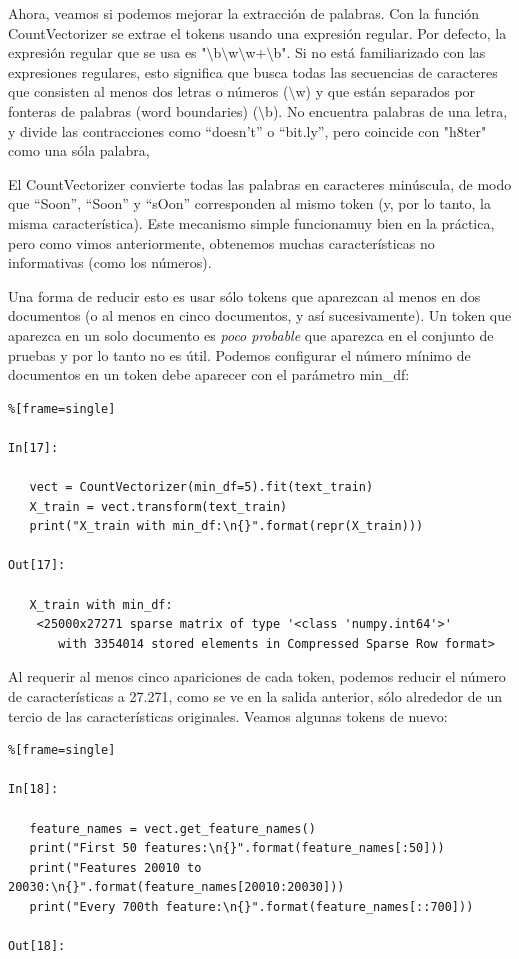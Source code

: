 Ahora, veamos si podemos mejorar la extracción de palabras.  Con la función  {\ttfamily CountVectorizer}
se extrae el tokens usando una expresión regular. Por defecto, la expresión regular que 
se usa es "{}$\setminus$b$\setminus$w$\setminus$w+$\setminus$b"{}.  
Si no está familiarizado con las expresiones regulares, esto significa que
busca todas las secuencias de caracteres que consisten  al menos dos letras o 
números ($\setminus$w) y que están separados por fonteras de palabras (word boundaries) ($\setminus$b). 
No encuentra palabras de una letra, y divide las contracciones como  “doesn’t{}”  o 
  “bit.ly{}”,  pero coincide  con "{}h8ter"{} como una sóla palabra,


 El {\ttfamily CountVectorizer} convierte todas las palabras en caracteres  minúscula, de modo que
“Soon”, “Soon” y “sOon” corresponden al mismo token (y, por lo tanto, la misma característica).
Este mecanismo simple funcionamuy bien en la práctica, pero como vimos anteriormente, obtenemos
muchas características no informativas (como los números). 

Una forma de reducir esto es  usar sólo tokens que aparezcan  al menos en dos documentos (o al menos en cinco documentos, y así sucesivamente). Un token que aparezca en un solo documento  es \emph{poco probable} que aparezca en el conjunto de pruebas y por lo tanto no es útil. Podemos configurar el número mínimo de documentos en un token debe aparecer con el parámetro {\ttfamily min\_df}:

\begin{lstlisting}%[frame=single]

In[17]:

   vect = CountVectorizer(min_df=5).fit(text_train)
   X_train = vect.transform(text_train)
   print("X_train with min_df:\n{}".format(repr(X_train)))

Out[17]:

   X_train with min_df:
    <25000x27271 sparse matrix of type '<class 'numpy.int64'>'
       with 3354014 stored elements in Compressed Sparse Row format>

\end{lstlisting}

Al requerir al menos cinco apariciones de cada token, podemos reducir el número de características a 27.271, como se ve en la salida anterior, sólo alrededor de un tercio de las características originales. Veamos algunas tokens de nuevo:

\begin{lstlisting}%[frame=single]

In[18]:

   feature_names = vect.get_feature_names()
   print("First 50 features:\n{}".format(feature_names[:50]))
   print("Features 20010 to 20030:\n{}".format(feature_names[20010:20030]))
   print("Every 700th feature:\n{}".format(feature_names[::700]))

Out[18]:
\end{lstlisting}

